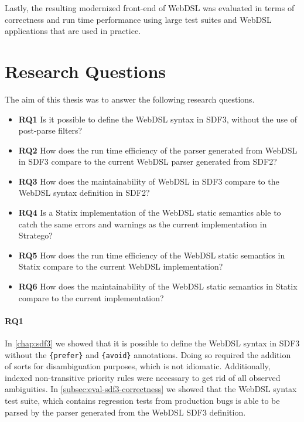   Lastly, the resulting modernized front-end of WebDSL was evaluated in terms of correctness and run time performance using large test suites and WebDSL applications that are used in practice.

  \section{\label{sec:answering-research-questions}Research Questions}

    The aim of this thesis was to answer the following research questions.

    \begin{itemize}
      \item \textbf{RQ1} Is it possible to define the WebDSL syntax in SDF3, without the use of post-parse filters?
      \item \textbf{RQ2} How does the run time efficiency of the parser generated from WebDSL in SDF3 compare to the current WebDSL parser generated from SDF2?
      \item \textbf{RQ3} How does the maintainability of WebDSL in SDF3 compare to the WebDSL syntax definition in SDF2?
      \item \textbf{RQ4} Is a Statix implementation of the WebDSL static semantics able to catch the same errors and warnings as the current implementation in Stratego?
      \item \textbf{RQ5} How does the run time efficiency of the WebDSL static semantics in Statix compare to the current WebDSL implementation?
      \item \textbf{RQ6} How does the maintainability of the WebDSL static semantics in Statix compare to the current implementation?
    \end{itemize}

    \paragraph{RQ1} In \cref{chap:sdf3} we showed that it is possible to define the WebDSL syntax in SDF3 without the \texttt{\{prefer\}} and \texttt{\{avoid\}} annotations. Doing so required the addition of sorts for disambiguation purposes, which is not idiomatic. Additionally, indexed non-transitive priority rules were necessary to get rid of all observed ambiguities. In \cref{subsec:eval-sdf3-correctness} we showed that the WebDSL syntax test suite, which contains regression tests from production bugs is able to be parsed by the parser generated from the WebDSL SDF3 definition.

